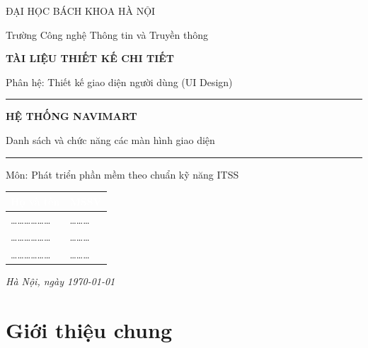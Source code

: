 \documentclass[12pt,a4paper]{article}
\newcommand{\thead}[1]{\textbf{\textcolor{white}{#1}}}
\begin{document}
\begin{titlepage}
\centering
\vspace*{1.2cm}
{\large ĐẠI HỌC BÁCH KHOA HÀ NỘI\par}
{\large Trường Công nghệ Thông tin và Truyền thông\par}
\vspace{2.4cm}
{\large\bfseries TÀI LIỆU THIẾT KẾ CHI TIẾT\par}
{\normalsize Phân hệ: Thiết kế giao diện người dùng (UI Design)\par}
\vspace{1.4cm}
\rule{0.8\linewidth}{0.4pt}\par
\vspace{0.6cm}
{\Huge\bfseries\color{navy} HỆ THỐNG NAVIMART\par}
\vspace{0.5cm}
{\large Danh sách và chức năng các màn hình giao diện\par}
\vspace{0.4cm}
\rule{0.8\linewidth}{0.4pt}\par
\vspace{1.2cm}
{\large Môn: Phát triển phần mềm theo chuẩn kỹ năng ITSS\par}
\vspace{2cm}

\begin{tabular}{|l|l|}
\hline
\rowcolor{headerblue}
\thead{Họ và tên} & \thead{MSSV} \\
\hline
\rule{0pt}{2.4ex}\dots\dots\dots\dots\dots\dots & \dots\dots\dots \\
\hline
\rule{0pt}{2.4ex}\dots\dots\dots\dots\dots\dots & \dots\dots\dots \\
\hline
\rule{0pt}{2.4ex}\dots\dots\dots\dots\dots\dots & \dots\dots\dots \\
\hline
\end{tabular}

\vfill
{\itshape Hà Nội, ngày \today\par}
\end{titlepage}

\tableofcontents
\newpage

\section{Giới thiệu chung}
\end{document}
